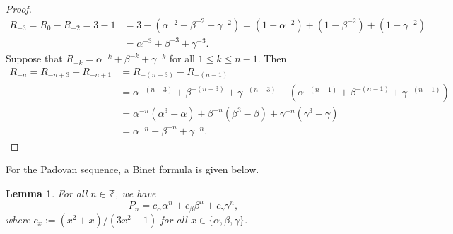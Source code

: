 \documentclass[11pt,a4paper]{article}
\newtheorem{lemma}[theorem]{Lemma}
\numberwithin{equation}{section}
\numberwithin{table}{section}
\numberwithin{figure}{section}
\begin{document}
\begin{proof}
\begin{align*}
R_{-3}=R_{0}-R_{-2}=3-1&=3-(\alpha^{-2}+\beta^{-2}+\gamma^{-2})=(1-\alpha^{-2})+(1-\beta^{-2})+(1-\gamma^{-2})\\
&=\alpha^{-3}+\beta^{-3}+\gamma^{-3}.
\end{align*}
Suppose that $R_{-k}=\alpha^{-k}+\beta^{-k}+\gamma^{-k}$ for all $1\le k\le n-1$. Then
\begin{align*}
R_{-n}=R_{-n+3}-R_{-n+1}&=R_{-(n-3)}-R_{-(n-1)}\\
&=\alpha^{-(n-3)}+\beta^{-(n-3)}+\gamma^{-(n-3)}-(\alpha^{-(n-1)}+\beta^{-(n-1)}+\gamma^{-(n-1)})\\
&=\alpha^{-n}(\alpha^{3}-\alpha)+\beta^{-n}(\beta^{3}-\beta)+\gamma^{-n}(\gamma^{3}-\gamma)\\
&=\alpha^{-n}+\beta^{-n}+\gamma^{-n}.
\end{align*}
\end{proof}
For the Padovan sequence, a Binet formula is given below.
\begin{lemma}\label{eq:binet_padovan}
For all $n \in \mathbb{Z}$, we have
\begin{equation*}
	P_n = c_{\alpha}\alpha^n + c_{\beta}\beta^n + c_{\gamma}\gamma^n,
\end{equation*}
where $c_{x}:=(x^{2}+x)/(3x^{2}-1)$ for all $x\in \{\alpha,\beta, \gamma\}$.  
\end{lemma}
\end{document}

